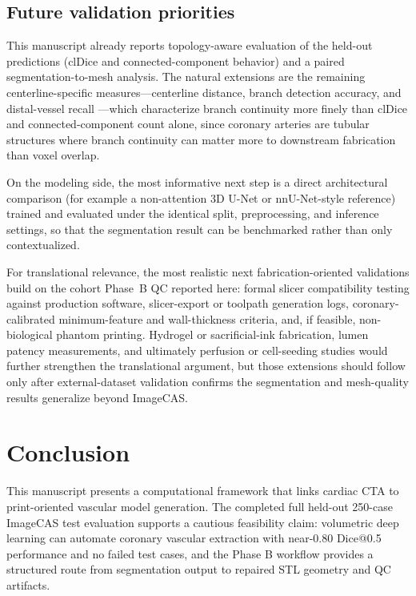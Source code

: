 \documentclass[anonymous]{iopjournal}
\begin{document}
\subsection{Future validation priorities}

This manuscript already reports topology-aware evaluation of the held-out predictions (clDice and connected-component behavior) and a paired segmentation-to-mesh analysis. The natural extensions are the remaining centerline-specific measures---centerline distance, branch detection accuracy, and distal-vessel recall \cite{shit2021}---which characterize branch continuity more finely than clDice and connected-component count alone, since coronary arteries are tubular structures where branch continuity can matter more to downstream fabrication than voxel overlap.

On the modeling side, the most informative next step is a direct architectural comparison (for example a non-attention 3D U-Net or nnU-Net-style reference) trained and evaluated under the identical split, preprocessing, and inference settings, so that the segmentation result can be benchmarked rather than only contextualized.

For translational relevance, the most realistic next fabrication-oriented validations build on the cohort Phase~B QC reported here: formal slicer compatibility testing against production software, slicer-export or toolpath generation logs, coronary-calibrated minimum-feature and wall-thickness criteria, and, if feasible, non-biological phantom printing. Hydrogel or sacrificial-ink fabrication, lumen patency measurements, and ultimately perfusion or cell-seeding studies would further strengthen the translational argument, but those extensions should follow only after external-dataset validation confirms the segmentation and mesh-quality results generalize beyond ImageCAS.

\section{Conclusion}

This manuscript presents a computational framework that links cardiac CTA to print-oriented vascular model generation. The completed full held-out 250-case ImageCAS test evaluation supports a cautious feasibility claim: volumetric deep learning can automate coronary vascular extraction with near-0.80 Dice@0.5 performance and no failed test cases, and the Phase B workflow provides a structured route from segmentation output to repaired STL geometry and QC artifacts.
\end{document}

